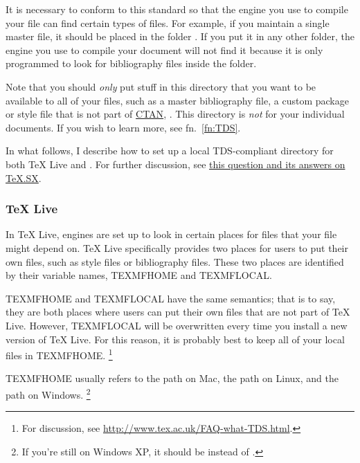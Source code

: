 It is necessary to conform to this standard so that the engine you use to compile your  file can find certain types of files.
For example, if you maintain a single master  file, it should be placed in the folder .
If you put it in any other folder, the engine you use to compile your document will not find it because it is only programmed to look for bibliography files inside the  folder.

Note that you should \emph{only} put stuff in this directory that you want to be available to all of your  files, such as a master bibliography file, a custom package or style file that is not part of \href{http://ctan.org/}{CTAN}, \ETC.
This directory is \emph{not} for your individual  documents.
If you wish to learn more, see fn.~\ref{fn:TDS}.

In what follows, I describe how to set up a local TDS-compliant directory for both TeX Live and .
For further discussion, see \href{http://tex.stackexchange.com/q/1137/32888}{this question and its answers on TeX.SX}.

\subsubsection{TeX Live}
\label{subsubsec:local-files:tex-live}

In TeX Live, engines are set up to look in certain places for files that your  file might depend on.
TeX Live specifically provides two places for users to put their own files, such as style files or bibliography files.
These two places are identified by their variable names, TEXMFHOME and TEXMFLOCAL.

TEXMFHOME and TEXMFLOCAL have the same semantics; that is to say, they are both places where users can put their own files that are not part of TeX Live.
However, TEXMFLOCAL will be overwritten every time you install a new version of TeX Live.
For this reason, it is probably best to keep all of your local files in TEXMFHOME.%
\footnote{%
For discussion, see \url{http://www.tex.ac.uk/FAQ-what-TDS.html}.%
}

TEXMFHOME usually refers to the path  on Mac, the path  on Linux, and the path  on Windows.%
\footnote{%
If you're still on Windows XP, it should be  instead of .%
}

